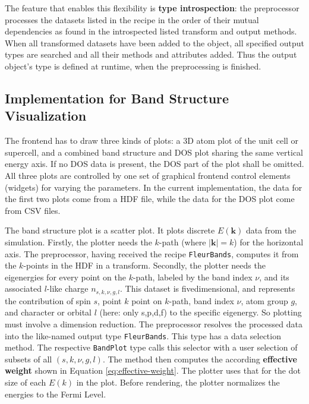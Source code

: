 The feature that enables this flexibility is \textbf{type introspection}: the
preprocessor processes the datasets listed in the recipe in the order of their
mutual dependencies as found in the introspected listed transform and output
methods. When all transformed datasets have been added to the object, all
specified output types are searched and all their methods and attributes added.
Thus the output object's type is defined at runtime, when the preprocessing is
finished.


% 


\subsection{Implementation for Band Structure Visualization}
\label{sec:preprocessor-implementation}

The frontend has to draw three kinds of plots: a 3D atom plot of the unit cell
or supercell, and a combined band structure and DOS plot sharing the same
vertical energy axis. If no DOS data is present, the DOS part of the plot shall
be omitted. All three plots are controlled by one set of graphical frontend
control elements (widgets) for varying the parameters. In the current
implementation, the data for the first two plots come from a HDF file, while the
data for the DOS plot come from CSV files.

The band structure plot is a scatter plot. It plots discrete \(E(\mathbf{k})\)
data from the simulation. Firstly, the plotter needs the \(k\)-path (where
\(|\mathbf{k}|=k\)) for the horizontal axis. The preprocessor, having received
the recipe \texttt{FleurBands}, computes it from the \(k\)-points in the HDF in
a transform. Secondly, the plotter needs the eigenergies for every point on the
\(k\)-path, labeled by the band index \(\nu\), and its associated \(l\)-like
charge \(n_{s,k,\nu,g,l}\). This dataset is fivedimensional, and represents the
contribution of spin \(s\), point \(k\) point on \(k\)-path, band index \(\nu\),
atom group \(g\), and character or orbital \(l\) (here: only s,p,d,f) to the
specific eigenergy. So plotting must involve a dimension reduction. The
preprocessor resolves the processed data into the like-named output type
\texttt{FleurBands}. This type has a data selection method. The respective
\texttt{BandPlot} type calls this selector with a user selection of subsets of
all \((s,k,\nu,g,l)\). The method then computes the according \textbf{effective
  weight} shown in Equation \ref{eq:effective-weight}. The plotter uses that for
the dot size of each \(E(k)\) in the plot. Before rendering, the plotter
normalizes the energies to the Fermi Level.

